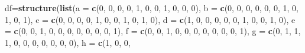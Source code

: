 \documentclass[
]{book}
\newenvironment{Shaded}{\begin{snugshade}}{\end{snugshade}}
\newcommand{\AttributeTok}[1]{\textcolor[rgb]{0.13,0.29,0.53}{#1}}
\newcommand{\DecValTok}[1]{\textcolor[rgb]{0.00,0.00,0.81}{#1}}
\newcommand{\FunctionTok}[1]{\textcolor[rgb]{0.13,0.29,0.53}{\textbf{#1}}}
\newcommand{\NormalTok}[1]{#1}
\newcommand{\OtherTok}[1]{\textcolor[rgb]{0.56,0.35,0.01}{#1}}
\theoremstyle{definition}
\theoremstyle{definition}
\theoremstyle{definition}
\theoremstyle{definition}
\theoremstyle{remark}
\begin{document}
\begin{Shaded}
\begin{Highlighting}[]
\NormalTok{df}\OtherTok{=}\FunctionTok{structure}\NormalTok{(}\FunctionTok{list}\NormalTok{(}\AttributeTok{a =} \FunctionTok{c}\NormalTok{(}\DecValTok{0}\NormalTok{, }\DecValTok{0}\NormalTok{, }\DecValTok{0}\NormalTok{, }\DecValTok{0}\NormalTok{, }\DecValTok{1}\NormalTok{, }\DecValTok{0}\NormalTok{, }\DecValTok{0}\NormalTok{, }\DecValTok{1}\NormalTok{, }\DecValTok{0}\NormalTok{, }\DecValTok{0}\NormalTok{, }\DecValTok{0}\NormalTok{), }\AttributeTok{b =} \FunctionTok{c}\NormalTok{(}\DecValTok{0}\NormalTok{, }
\DecValTok{0}\NormalTok{, }\DecValTok{0}\NormalTok{, }\DecValTok{0}\NormalTok{, }\DecValTok{0}\NormalTok{, }\DecValTok{0}\NormalTok{, }\DecValTok{1}\NormalTok{, }\DecValTok{0}\NormalTok{, }\DecValTok{1}\NormalTok{, }\DecValTok{0}\NormalTok{, }\DecValTok{1}\NormalTok{), }\AttributeTok{c =} \FunctionTok{c}\NormalTok{(}\DecValTok{0}\NormalTok{, }\DecValTok{0}\NormalTok{, }\DecValTok{0}\NormalTok{, }\DecValTok{0}\NormalTok{, }\DecValTok{1}\NormalTok{, }\DecValTok{0}\NormalTok{, }\DecValTok{0}\NormalTok{, }\DecValTok{1}\NormalTok{, }
\DecValTok{0}\NormalTok{, }\DecValTok{1}\NormalTok{, }\DecValTok{0}\NormalTok{), }\AttributeTok{d =} \FunctionTok{c}\NormalTok{(}\DecValTok{1}\NormalTok{, }\DecValTok{0}\NormalTok{, }\DecValTok{0}\NormalTok{, }\DecValTok{0}\NormalTok{, }\DecValTok{0}\NormalTok{, }\DecValTok{0}\NormalTok{, }\DecValTok{1}\NormalTok{, }\DecValTok{0}\NormalTok{, }\DecValTok{0}\NormalTok{, }\DecValTok{1}\NormalTok{, }\DecValTok{0}\NormalTok{), }\AttributeTok{e =} \FunctionTok{c}\NormalTok{(}\DecValTok{0}\NormalTok{, }\DecValTok{0}\NormalTok{, }
\DecValTok{1}\NormalTok{, }\DecValTok{0}\NormalTok{, }\DecValTok{0}\NormalTok{, }\DecValTok{0}\NormalTok{, }\DecValTok{0}\NormalTok{, }\DecValTok{0}\NormalTok{, }\DecValTok{0}\NormalTok{, }\DecValTok{0}\NormalTok{, }\DecValTok{1}\NormalTok{), }\AttributeTok{f =} \FunctionTok{c}\NormalTok{(}\DecValTok{0}\NormalTok{, }\DecValTok{0}\NormalTok{, }\DecValTok{1}\NormalTok{, }\DecValTok{0}\NormalTok{, }\DecValTok{0}\NormalTok{, }\DecValTok{0}\NormalTok{, }\DecValTok{0}\NormalTok{, }\DecValTok{0}\NormalTok{, }\DecValTok{0}\NormalTok{, }
\DecValTok{0}\NormalTok{, }\DecValTok{1}\NormalTok{), }\AttributeTok{g =} \FunctionTok{c}\NormalTok{(}\DecValTok{0}\NormalTok{, }\DecValTok{1}\NormalTok{, }\DecValTok{1}\NormalTok{, }\DecValTok{1}\NormalTok{, }\DecValTok{0}\NormalTok{, }\DecValTok{0}\NormalTok{, }\DecValTok{0}\NormalTok{, }\DecValTok{0}\NormalTok{, }\DecValTok{0}\NormalTok{, }\DecValTok{0}\NormalTok{, }\DecValTok{0}\NormalTok{), }\AttributeTok{h =} \FunctionTok{c}\NormalTok{(}\DecValTok{1}\NormalTok{, }\DecValTok{0}\NormalTok{, }\DecValTok{0}\NormalTok{, }

\end{Highlighting}
\end{Shaded}
\end{document}
